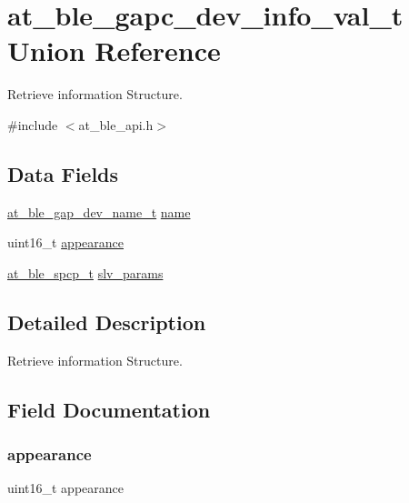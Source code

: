 \hypertarget{unionat__ble__gapc__dev__info__val__t}{}\section{at\+\_\+ble\+\_\+gapc\+\_\+dev\+\_\+info\+\_\+val\+\_\+t Union Reference}
\label{unionat__ble__gapc__dev__info__val__t}


Retrieve information Structure.  




{\ttfamily \#include $<$at\+\_\+ble\+\_\+api.\+h$>$}

\subsection*{Data Fields}
\begin{DoxyCompactItemize}
\item 
\mbox{\hyperlink{structat__ble__gap__dev__name__t}{at\+\_\+ble\+\_\+gap\+\_\+dev\+\_\+name\+\_\+t}} \mbox{\hyperlink{unionat__ble__gapc__dev__info__val__t_a3f127c06ed9fc788bfcea253ab0b9d43}{name}}
\item 
uint16\+\_\+t \mbox{\hyperlink{unionat__ble__gapc__dev__info__val__t_aae507e6864c05476c851ba7548517a3c}{appearance}}
\item 
\mbox{\hyperlink{structat__ble__spcp__t}{at\+\_\+ble\+\_\+spcp\+\_\+t}} \mbox{\hyperlink{unionat__ble__gapc__dev__info__val__t_a4bc48c20ac9f987e7c458fa3bca69e7b}{slv\+\_\+params}}
\end{DoxyCompactItemize}


\subsection{Detailed Description}
Retrieve information Structure. 

\subsection{Field Documentation}
\mbox{\label{unionat__ble__gapc__dev__info__val__t_aae507e6864c05476c851ba7548517a3c}} 
\subsubsection{\texorpdfstring{appearance}{appearance}}
{\footnotesize\ttfamily uint16\+\_\+t appearance}

